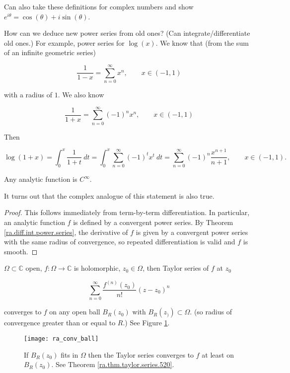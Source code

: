 Can also take these definitions for complex numbers and show \(e^{i \theta} = \cos(\theta) + i \sin(\theta)\).

How can we deduce new power series from old ones? (Can integrate/differentiate old ones.) For example, power series for \(\log(x)\). We know that (from the sum of an infinite geometric series)

\[
\frac{1}{1-x} = \sum_{n=0}^\infty x^n, \qquad x \in (-1,1)
\]

with a radius of \(1\). We also know

\[
\frac{1}{1+x} = \sum_{n=0}^\infty (-1)^n x^n, \qquad x \in (-1,1)
\]

Then

\[
\log(1 + x) = 
\int_0^x \frac{1}{1+t} \ dt = \int_0^x  \sum_{n=0}^\infty (-1)^t x^t \ dt 
=  \sum_{n=0}^\infty (-1)^n \frac{x^{n+1}}{n+1}, \qquad x \in (-1,1).
\]

\begin{theorem}

Any analytic function is \(C^\infty\). 

\end{theorem}

\begin{remark}

It turns out that the complex analogue of this statement is also true.

\end{remark}

\begin{proof}

This follows immediately from term-by-term differentiation. In particular, an analytic function \(f\) is defined by a convergent power series. By Theorem \ref{ra.diff.int.power.series}, the derivative of \(f\) is given by a convergent power series with the same radius of convergence, so repeated differentiation is valid and \(f\) is smooth.
\end{proof}

\begin{theorem}\label{ra.thm.taylor.series.520}

\(\Omega \subset \mathbb{C}\) open, \(f: \Omega \to \mathbb{C}\) is holomorphic, \(z_0 \in \Omega\), then Taylor series of \(f\) at \(z_0\)

\[
\sum_{n=0}^\infty \frac{f^{(n)}(z_0)}{n!} (z - z_0)^n
\]

converges to \(f\) on any open ball \(B_R(z_0)\) with \(B_R(z_)) \subset \Omega\). (so radius of convergence greater than or equal to \(R\).) See Figure \ref{ra_conv_ball_fig}.

\begin{figure}[htbp]
\begin{center}
\texttt{[image: ra\_conv\_ball]}
\caption{If \(B_R(z_0)\) fits in \(\Omega\) then the Taylor series converges to \(f\) at least on \(B_R(z_0)\). See Theorem \ref{ra.thm.taylor.series.520}.}
\label{ra_conv_ball_fig}
\end{center}
\end{figure}


\end{theorem}



